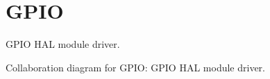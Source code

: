 \hypertarget{group__GPIO}{}\section{G\+P\+IO}
\label{group__GPIO}


G\+P\+IO H\+AL module driver.  


Collaboration diagram for G\+P\+IO\+:
G\+P\+IO H\+AL module driver. 

